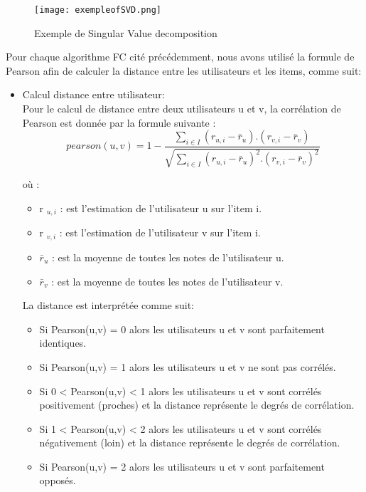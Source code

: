 \begin{figure}[H]
	\centering
	\texttt{[image: exempleofSVD.png]}
	\caption{Exemple de Singular Value decomposition \cite{ref31}}
	\label{fig:exemplesvd}
\end{figure}
Pour chaque algorithme FC cité précédemment, nous avons utilisé la formule de Pearson afin de calculer la distance entre les utilisateurs et les items, comme suit: 
\begin{itemize}
\item Calcul distance entre utilisateur:\\
Pour le calcul de distance entre deux utilisateurs u et v, la corrélation de Pearson est donnée par la formule suivante :
\begin{equation}\label{key21}
pearson(u,v)= 1 - \frac{\sum_{i \in I} (r_{u,i}-\bar{r}_{u}).(r_{v,i}-\bar{r}_{v})}{\sqrt{\sum_{i \in I} (r_{u,i}-\bar{r}_{u})^{2}.(r_{v,i}-\bar{r}_{v})^{2}}}
\end{equation}

où :
\begin{itemize}
	\item r $_{u,i}$ : est l'estimation de l'utilisateur u sur l’item i.
	\item r $_{v,i}$ : est l'estimation de l'utilisateur v sur l’item i.
	\item $\bar{r}_{u}$ : est la moyenne de toutes les notes de l'utilisateur u. 
	\item $\bar{r}_{v}$ : est la moyenne de toutes les notes de l'utilisateur v.
\end{itemize}

La distance est interprétée comme suit:

\begin{itemize}
	\item Si Pearson(u,v) = 0 alors les utilisateurs u et v sont parfaitement identiques.
	\item Si Pearson(u,v) = 1 alors les utilisateurs u et v ne sont pas corrélés. 
	\item Si 0 < Pearson(u,v) < 1  alors les utilisateurs u et v sont corrélés positivement (proches) et la distance représente le degrés de corrélation. 
	\item Si 1 < Pearson(u,v) < 2  alors les utilisateurs u et v sont corrélés négativement (loin) et la distance représente le degrés de corrélation. 
	\item Si Pearson(u,v) = 2 alors les utilisateurs u et v sont parfaitement opposés.
\end{itemize}


\end{itemize}
